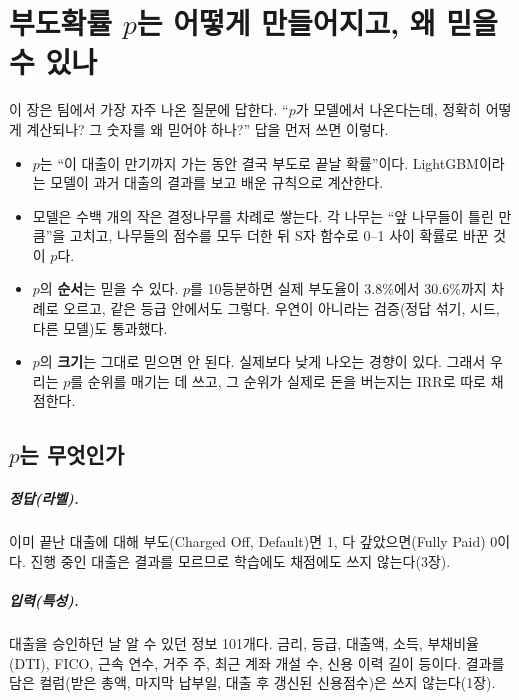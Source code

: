 \chapter{부도확률 $p$는 어떻게 만들어지고, 왜 믿을 수 있나}

이 장은 팀에서 가장 자주 나온 질문에 답한다. ``$p$가 모델에서 나온다는데, 정확히 어떻게 계산되나? 그 숫자를 왜 믿어야 하나?'' 답을 먼저 쓰면 이렇다.

\begin{keybox}[이 장의 답]
\begin{itemize}[leftmargin=*]
\item $p$는 ``이 대출이 만기까지 가는 동안 결국 부도로 끝날 확률''이다. LightGBM이라는 모델이 과거 대출의 결과를 보고 배운 규칙으로 계산한다.
\item 모델은 수백 개의 작은 결정나무를 차례로 쌓는다. 각 나무는 ``앞 나무들이 틀린 만큼''을 고치고, 나무들의 점수를 모두 더한 뒤 S자 함수로 0--1 사이 확률로 바꾼 것이 $p$다.
\item $p$의 \textbf{순서}는 믿을 수 있다. $p$를 10등분하면 실제 부도율이 3.8\%에서 30.6\%까지 차례로 오르고, 같은 등급 안에서도 그렇다. 우연이 아니라는 검증(정답 섞기, 시드, 다른 모델)도 통과했다.
\item $p$의 \textbf{크기}는 그대로 믿으면 안 된다. 실제보다 낮게 나오는 경향이 있다. 그래서 우리는 $p$를 순위를 매기는 데 쓰고, 그 순위가 실제로 돈을 버는지는 IRR로 따로 채점한다.
\end{itemize}
\end{keybox}

\section{$p$는 무엇인가}
\paragraph{정답(라벨).} 이미 끝난 대출에 대해 부도(Charged Off, Default)면 1, 다 갚았으면(Fully Paid) 0이다. 진행 중인 대출은 결과를 모르므로 학습에도 채점에도 쓰지 않는다(3장).

\paragraph{입력(특성).} 대출을 승인하던 날 알 수 있던 정보 101개다. 금리, 등급, 대출액, 소득, 부채비율(DTI), FICO, 근속 연수, 거주 주, 최근 계좌 개설 수, 신용 이력 길이 등이다. 결과를 담은 컬럼(받은 총액, 마지막 납부일, 대출 후 갱신된 신용점수)은 쓰지 않는다(1장).

